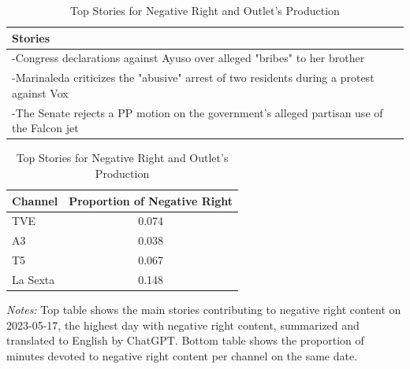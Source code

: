 \documentclass[12pt]{article}
\begin{document}
	
		\begin{table}[!htb]
								\caption{Top Stories for Negative Right and Outlet's Production}
		\centering
		\begin{tabular}{p{}}
			\toprule
			\textbf{Stories}  \\
			\midrule
			-Congress declarations against Ayuso over alleged "bribes" to her brother  \\
			-Marinaleda criticizes the "abusive" arrest of two residents during a protest against Vox  \\
			-The Senate rejects a PP motion on the government's alleged partisan use of the Falcon jet  \\
			\bottomrule
		\end{tabular}
		\begin{tabular}{l c}
			\toprule
			\textbf{Channel} & \textbf{Proportion of Negative Right} \\
			\midrule
			TVE & 0.074 \\
			A3  & 0.038 \\
			T5 & 0.067 \\
			La Sexta  & 0.148 \\
			\bottomrule
		\end{tabular}
			\begin{tablenotes}
			\small
			\item \textit{Notes:} Top table shows the main stories contributing to negative right content on 2023-05-17, the highest day with negative right content,  summarized and translated to English by ChatGPT. Bottom table shows the proportion of minutes devoted to negative right content per channel on the same date. 
		\end{tablenotes}

		\label{tab:neg_right_channels}
	\end{table}
	
\end{document}
